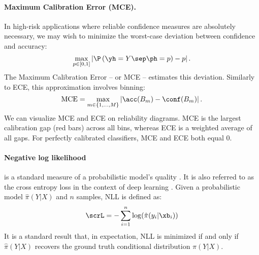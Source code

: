 \paragraph{Maximum Calibration Error (MCE).} In high-risk applications where reliable confidence measures are absolutely necessary, we may wish to minimize the worst-case deviation between confidence and accuracy:
%
\begin{equation}
  \max_{p \in [0, 1]} \left| \P\left(\yh = Y \sep \ph = p\right) - p \right|.
\end{equation}
%
The Maximum Calibration Error \citep{naeini2015obtaining} -- or MCE -- estimates this deviation. Similarly to ECE, this approximation involves binning:
\begin{equation}
\label{mce}
\text{MCE} = \max_{m \in \{1,\ldots,M\} }\left|\acc(B_m) - \conf(B_m)\right|.
\end{equation}
We can visualize MCE and ECE on reliability diagrams.
MCE is the largest calibration gap (red bars) across all bins, whereas ECE is a weighted average of all gaps.
For perfectly calibrated classifiers, MCE and ECE both equal 0.

\paragraph{Negative log likelihood} is a standard measure of a probabilistic model's quality \cite{friedman2001elements}. It is also referred to as the cross entropy loss in the context of deep learning \cite{bengio2015deep}. Given a probabilistic model $\hat{\pi}(Y|X)$ and $n$ samples, NLL is defined as:
%
\begin{align}
  \scrL = -\sum_{i=1}^{n}\log(\hat{\pi}(y_i|\xb_i))
\end{align}
%
It is a standard result \cite{friedman2001elements} that, in expectation, NLL is minimized if and only if $\hat{\pi}(Y|X)$ recovers the ground truth conditional distribution $\pi(Y|X)$.
